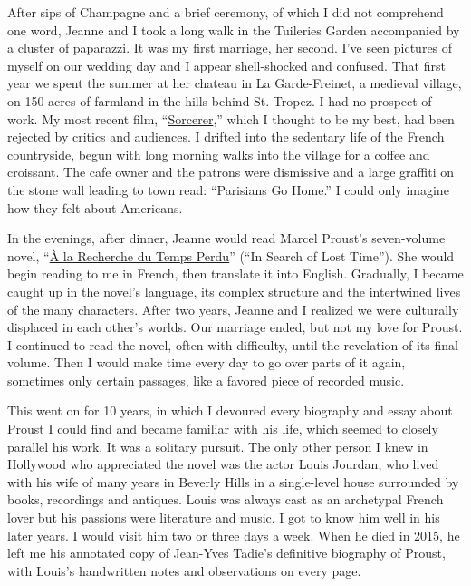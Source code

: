 After sips of Champagne and a brief ceremony, of which I did not
comprehend one word, Jeanne and I took a long walk in the Tuileries
Garden accompanied by a cluster of paparazzi. It was my first marriage,
her second. I've seen pictures of myself on our wedding day and I appear
shell-shocked and confused. That first year we spent the summer at her
chateau in La Garde-Freinet, a medieval village, on 150 acres of
farmland in the hills behind St.-Tropez. I had no prospect of work. My
most recent film,
``\href{http://www.imdb.com/title/tt0076740/}{Sorcerer},'' which I
thought to be my best, had been rejected by critics and audiences. I
drifted into the sedentary life of the French countryside, begun with
long morning walks into the village for a coffee and croissant. The cafe
owner and the patrons were dismissive and a large graffiti on the stone
wall leading to town read: ``Parisians Go Home.'' I could only imagine
how they felt about Americans.

In the evenings, after dinner, Jeanne would read Marcel Proust's
seven-volume novel,
``\href{http://www.penguinrandomhouse.com/books/220059/the-modern-library-in-search-of-lost-time-complete-and-unabridged-6-book-bundle-by-marcel-proust-translated-by-c-k-scott-moncrieff-terence-kilmartin-and-andreas-mayor-revised-by-d-j-enright/}{À
la Recherche du Temps Perdu}'' (``In Search of Lost Time''). She would
begin reading to me in French, then translate it into English.
Gradually, I became caught up in the novel's language, its complex
structure and the intertwined lives of the many characters. After two
years, Jeanne and I realized we were culturally displaced in each
other's worlds. Our marriage ended, but not my love for Proust. I
continued to read the novel, often with difficulty, until the revelation
of its final volume. Then I would make time every day to go over parts
of it again, sometimes only certain passages, like a favored piece of
recorded music.

This went on for 10 years, in which I devoured every biography and essay
about Proust I could find and became familiar with his life, which
seemed to closely parallel his work. It was a solitary pursuit. The only
other person I knew in Hollywood who appreciated the novel was the actor
Louis Jourdan, who lived with his wife of many years in Beverly Hills in
a single-level house surrounded by books, recordings and antiques. Louis
was always cast as an archetypal French lover but his passions were
literature and music. I got to know him well in his later years. I would
visit him two or three days a week. When he died in 2015, he left me his
annotated copy of Jean-Yves Tadie's definitive biography of Proust, with
Louis's handwritten notes and observations on every page.

